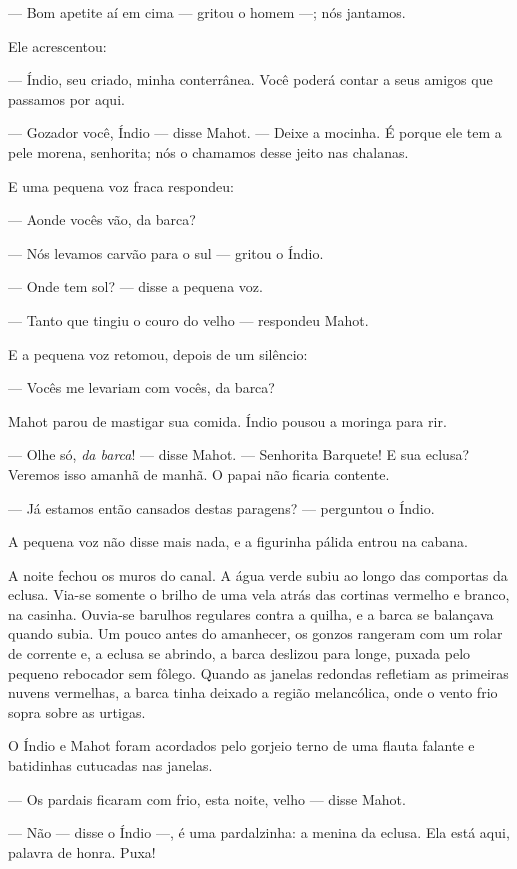 --- Bom apetite aí em cima --- gritou o homem ---; nós jantamos.

Ele acrescentou:

--- Índio, seu criado, minha conterrânea. Você poderá contar a seus amigos
que passamos por aqui.

--- Gozador você, Índio --- disse Mahot. --- Deixe a mocinha. É porque ele tem
a pele morena, senhorita; nós o chamamos desse jeito nas chalanas.

E uma pequena voz fraca respondeu:

--- Aonde vocês vão, da barca?

--- Nós levamos carvão para o sul --- gritou o Índio.

--- Onde tem sol? --- disse a pequena voz.

--- Tanto que tingiu o couro do velho --- respondeu Mahot.

E a pequena voz retomou, depois de um silêncio:

--- Vocês me levariam com vocês, da barca?

Mahot parou de mastigar sua comida. Índio pousou a moringa para rir.

--- Olhe só, \textit{da barca}! --- disse Mahot. --- Senhorita Barquete! E sua
eclusa? Veremos isso amanhã de manhã. O papai não ficaria contente.

--- Já estamos então cansados destas paragens? --- perguntou o Índio.

A pequena voz não disse mais nada, e a figurinha pálida entrou na cabana.

A noite fechou os muros do canal. A água verde subiu ao longo das
comportas da eclusa. Via-se somente o brilho de uma vela atrás das
cortinas vermelho e branco, na casinha. Ouvia-se barulhos regulares contra a
quilha, e a barca se balançava quando subia. Um pouco antes do amanhecer,
os gonzos rangeram com um rolar de corrente e, a eclusa se abrindo, a
barca deslizou para longe, puxada pelo pequeno rebocador sem fôlego.
Quando as janelas redondas refletiam as primeiras nuvens vermelhas, a
barca tinha deixado a região melancólica, onde o vento frio sopra sobre as urtigas.

O Índio e Mahot foram acordados pelo gorjeio terno de uma flauta falante
e batidinhas cutucadas nas janelas.

--- Os pardais ficaram com frio, esta noite, velho --- disse Mahot.

--- Não --- disse o Índio ---, é uma pardalzinha: a menina da eclusa. Ela está
aqui, palavra de honra. Puxa!

